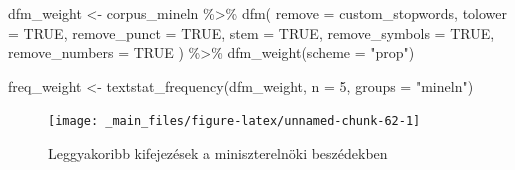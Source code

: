 \documentclass[
]{book}
\newenvironment{Shaded}{\begin{snugshade}}{\end{snugshade}}
\newcommand{\AttributeTok}[1]{\textcolor[rgb]{0.77,0.63,0.00}{#1}}
\newcommand{\ConstantTok}[1]{\textcolor[rgb]{0.00,0.00,0.00}{#1}}
\newcommand{\DecValTok}[1]{\textcolor[rgb]{0.00,0.00,0.81}{#1}}
\newcommand{\FunctionTok}[1]{\textcolor[rgb]{0.00,0.00,0.00}{#1}}
\newcommand{\NormalTok}[1]{#1}
\newcommand{\OtherTok}[1]{\textcolor[rgb]{0.56,0.35,0.01}{#1}}
\newcommand{\SpecialCharTok}[1]{\textcolor[rgb]{0.00,0.00,0.00}{#1}}
\newcommand{\StringTok}[1]{\textcolor[rgb]{0.31,0.60,0.02}{#1}}
\begin{document}
\begin{Shaded}
\begin{Highlighting}[]
\NormalTok{dfm\_weight }\OtherTok{\textless{}{-}}\NormalTok{ corpus\_mineln }\SpecialCharTok{\%\textgreater{}\%}
  \FunctionTok{dfm}\NormalTok{(}
    \AttributeTok{remove =}\NormalTok{ custom\_stopwords, }
    \AttributeTok{tolower =} \ConstantTok{TRUE}\NormalTok{, }
    \AttributeTok{remove\_punct =} \ConstantTok{TRUE}\NormalTok{, }
    \AttributeTok{stem =} \ConstantTok{TRUE}\NormalTok{, }
    \AttributeTok{remove\_symbols =} \ConstantTok{TRUE}\NormalTok{, }
    \AttributeTok{remove\_numbers =} \ConstantTok{TRUE}
\NormalTok{    ) }\SpecialCharTok{\%\textgreater{}\%}
  \FunctionTok{dfm\_weight}\NormalTok{(}\AttributeTok{scheme =} \StringTok{"prop"}\NormalTok{)}

\NormalTok{freq\_weight }\OtherTok{\textless{}{-}} \FunctionTok{textstat\_frequency}\NormalTok{(dfm\_weight, }\AttributeTok{n =} \DecValTok{5}\NormalTok{, }\AttributeTok{groups =} \StringTok{"mineln"}\NormalTok{)}
\end{Highlighting}
\end{Shaded}

\begin{Shaded}
\end{Shaded}

\begin{figure}

{\centering \texttt{[image: \_main\_files/figure-latex/unnamed-chunk-62-1]} 

}

\caption{Leggyakoribb kifejezések a miniszterelnöki beszédekben}\label{fig:unnamed-chunk-62}
\end{figure}
\end{document}
